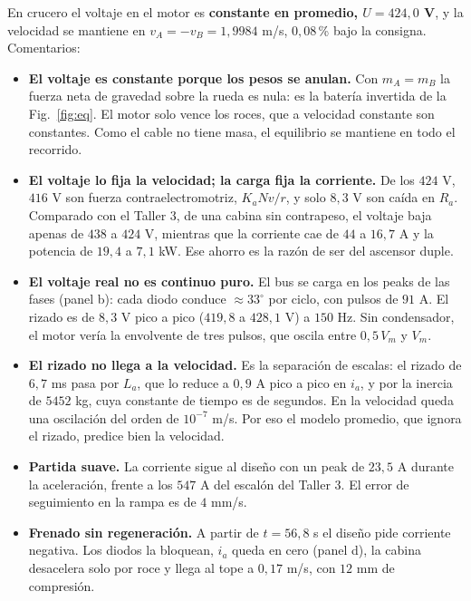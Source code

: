 \documentclass[10pt,a4paper,twocolumn]{article}
\begin{document}
En crucero el voltaje en el motor es \textbf{constante en promedio, $U = 424{,}0$ V}, y la
velocidad se mantiene en $v_A = -v_B = 1{,}9984$ m/s, $0{,}08$\,\% bajo la consigna.
Comentarios:
\begin{itemize}
  \item \textbf{El voltaje es constante porque los pesos se anulan.} Con $m_A = m_B$ la
        fuerza neta de gravedad sobre la rueda es nula: es la batería invertida de la
        Fig.~\ref{fig:eq}. El motor solo vence los roces, que a velocidad constante son
        constantes. Como el cable no tiene masa, el equilibrio se mantiene en todo el
        recorrido.
  \item \textbf{El voltaje lo fija la velocidad; la carga fija la corriente.} De los
        $424$ V, $416$ V son fuerza contraelectromotriz, $K_a N v/r$, y solo $8{,}3$ V son
        caída en $R_a$. Comparado con el Taller 3, de una cabina sin contrapeso, el voltaje
        baja apenas de $438$ a $424$ V, mientras que la corriente cae de $44$ a $16{,}7$ A y
        la potencia de $19{,}4$ a $7{,}1$ kW. Ese ahorro es la razón de ser del ascensor
        duple.
  \item \textbf{El voltaje real no es continuo puro.} El bus se carga en los peaks de las
        fases (panel b): cada diodo conduce $\approx 33^\circ$ por ciclo, con pulsos de
        $91$ A. El rizado es de $8{,}3$ V pico a pico ($419{,}8$ a $428{,}1$ V) a $150$ Hz.
        Sin condensador, el motor vería la envolvente de tres pulsos, que oscila entre
        $0{,}5\,V_m$ y $V_m$.
  \item \textbf{El rizado no llega a la velocidad.} Es la separación de escalas: el rizado
        de $6{,}7$ ms pasa por $L_a$, que lo reduce a $0{,}9$ A pico a pico en $i_a$, y por la
        inercia de $5452$ kg, cuya constante de tiempo es de segundos. En la velocidad
        queda una oscilación del orden de $10^{-7}$ m/s. Por eso el modelo promedio, que
        ignora el rizado, predice bien la velocidad.
  \item \textbf{Partida suave.} La corriente sigue al diseño con un peak de $23{,}5$ A
        durante la aceleración, frente a los $547$ A del escalón del Taller 3. El error de
        seguimiento en la rampa es de $4$ mm/s.
  \item \textbf{Frenado sin regeneración.} A partir de $t = 56{,}8$ s el diseño pide
        corriente negativa. Los diodos la bloquean, $i_a$ queda en cero (panel d), la cabina
        desacelera solo por roce y llega al tope a $0{,}17$ m/s, con $12$ mm de compresión.
\end{itemize}
\end{document}
